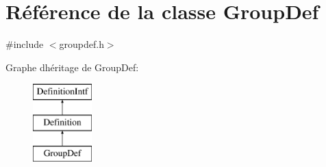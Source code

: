 \hypertarget{class_group_def}{}\section{Référence de la classe Group\+Def}
\label{class_group_def}


{\ttfamily \#include $<$groupdef.\+h$>$}

Graphe d\textquotesingle{}héritage de Group\+Def\+:\begin{figure}[H]
\begin{center}
\leavevmode
\includegraphics[height=3.000000cm]{class_group_def}
\end{center}
\end{figure}

